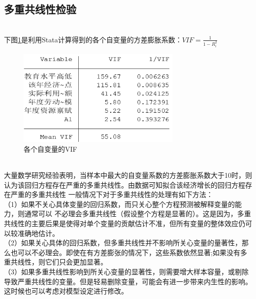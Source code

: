 \documentclass[UTF8]{article}
\begin{document}
	\subsection{多重共线性检验}
	~\\下图\ref{vif}是利用Stata计算得到的各个自变量的方差膨胀系数：$VIF=\frac{1}{1-R^2_{i}}$
	\begin{figure}[htb]
	\centering
	\includegraphics[width=8cm]{pictures/VIF.png}
	\caption{各个自变量的VIF}
	\label{vif}
	\end{figure}
	\\大量数学研究经验表明，当样本中最大的自变量系数的方差膨胀系数大于10时，则认为该回归方程存在严重的多重共线性。由数据可知拟合该经济增长的回归方程存在严重的多重共线性
	一般情况下对于多重共线性的处理有如下方法：
	\\（1）如果不关心具体变量的回归系数，而只关心整个方程预测被解释变量的能力，则通常可以 不必理会多重共线性（假设整个方程是显著的）。这是因为，多重共线性的主要后果是使得对单个变量的贡献估计不准，但所有变量的整体效应仍可以较准确地估计。
	\\（2）如果关心具体的回归系数，但多重共线性并不影响所关心变量的量著性，那么也可以不必理会。即使在有方差膨张的情况下，这些系数依然显著;如果没有多重共线性，则它们只会更加显著。
	\\（3）如果多重共线性影响到所关心变量的显著性，则需要增大样本容量，或剔除导致严重共线性的变量。但是轻易删除变量，可能会有进一步带来内生性的影响。这时候也可以考虑对模型设定进行修改。
\end{document}
